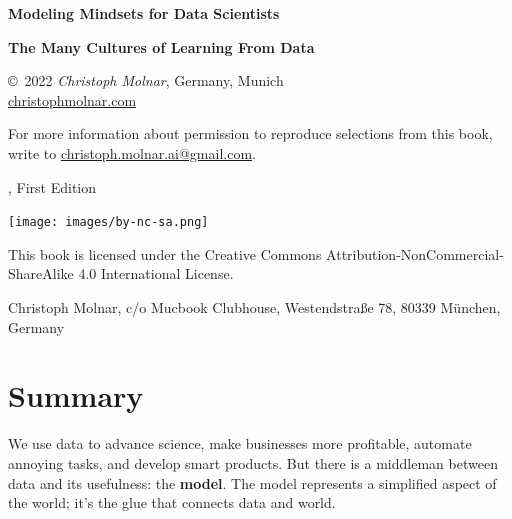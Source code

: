 \documentclass[
  10pt,
]{scrbook}
\begin{document}
\thispagestyle{empty}
\begin{center}
  {
  \bfseries \sffamily \LARGE Modeling Mindsets for Data Scientists \par
  \bfseries \small The Many Cultures of Learning From Data  \par
}

\copyright~2022 \textit{Christoph Molnar}, Germany, Munich\\
\url{christophmolnar.com}

For more information about permission to reproduce selections from this book, write to \url{christoph.molnar.ai@gmail.com}.

	\the\year, First Edition

\ifxetex
	\textsc{} 
\fi

\texttt{[image: images/by-nc-sa.png]}

This book is licensed under the Creative Commons Attribution-NonCommercial-ShareAlike 4.0 International License.
  
  Christoph Molnar,
  c/o Mucbook Clubhouse,
  Westendstraße 78,
  80339 München, Germany

\end{center}

\newpage
\thispagestyle{empty}
\mbox{}
\newpage








{
\hypersetup{linkcolor=}
\setcounter{tocdepth}{1}
\tableofcontents
}
\hypertarget{summary}{%
\chapter*{Summary}\label{summary}}


We use data to advance science, make businesses more profitable, automate annoying tasks, and develop smart products.
But there is a middleman between data and its usefulness: the \textbf{model}.
The model represents a simplified aspect of the world; it's the glue that connects data and world.
\end{document}
